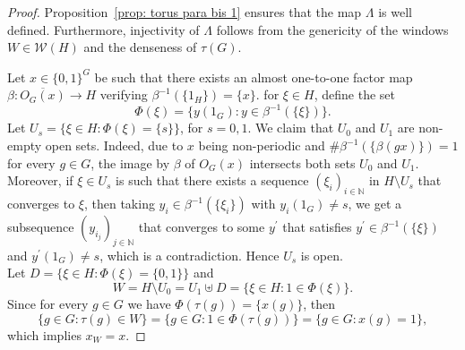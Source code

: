 \documentclass[titlepage,reqno,10pt]{amsart}
\theoremstyle{definition}
\def\N{{\mathbb N}}
\def\cW{{\mathcal W}}
\begin{document}
\begin{proof}
Proposition~\ref{prop: torus para bis 1} ensures that the map $\Lambda$ is well defined. Furthermore, injectivity of $\Lambda$ follows from the genericity of the windows $W\in\cW(H)$ and the denseness of $\tau(G)$.  

Let $x\in \{0,1\}^G$ be such that there exists an almost one-to-one factor map $\beta:\overline{O_G(x)}\to H$ verifying $\beta^{-1}(\{1_H\})=\{x\}$. for $\xi\in H$, define the set  
$$
\Phi(\xi)=\{y(1_G): y\in \beta^{-1}(\{\xi\})\}.
$$
Let $U_s=\{\xi\in H: \Phi(\xi)=\{s\} \}$, for $s=0,1$. We claim that $U_0$ and $U_1$ are non-empty open sets. Indeed, due to $x$ being non-periodic and $\#\beta^{-1}(\{\beta(gx)\})=1$ for every $g\in G$, 
 the image by $\beta$ of $O_G(x)$ intersects both sets $U_0$ and $U_1$. Moreover, if $\xi\in U_s$  is such that there exists a sequence $(\xi_i)_{i\in\mathbb{N}}$ in $H\setminus U_s$ that converges to $\xi$, then taking $y_i\in\beta^{-1}(\{\xi_i\})$  with $y_i(1_G)\neq s$, we get a subsequence $(y_{i_j})_{j\in\N}$ that converges to some $y^\prime$ that satisfies $y^\prime\in \beta^{-1}(\{\xi\})$ and $y^{\prime}(1_G)\neq s$, which is a contradiction. Hence $U_s$ is open. \\
Let $D=\{\xi\in H: \Phi(\xi)=\{0,1\}\}$ and
 $$
 W=H\setminus U_0=U_1\uplus D=\{\xi\in H: 1\in \Phi(\xi)\}. 
 $$
Since for every $g\in G$ we have $\Phi(\tau(g))=\{x(g)\}$, then
 $$  \{g\in G:\tau(g) \in W\} = \{g\in G:1\in \Phi(\tau(g))\} = \{g\in G:x(g)=1\},$$
which implies $x_W=x$.


\end{proof}
\end{document}
